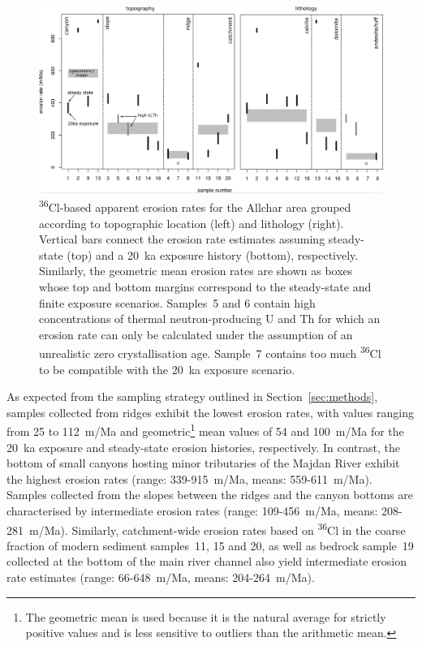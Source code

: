 \documentclass[titlepage]{article}
\begin{document}
\begin{figure}[!ht]
  \centering
  \includegraphics[width=\textwidth]{comparison.png}
  \caption{\textsuperscript{36}Cl-based apparent erosion rates for the
    Allchar area grouped according to topographic location (left) and
    lithology (right). Vertical bars connect the erosion rate
    estimates assuming steady-state (top) and a 20~ka exposure history
    (bottom), respectively. Similarly, the geometric mean erosion
    rates are shown as boxes whose top and bottom margins correspond
    to the steady-state and finite exposure scenarios. Samples~5 and 6
    contain high concentrations of thermal neutron-producing U and Th
    for which an erosion rate can only be calculated under the
    assumption of an unrealistic zero crystallisation age.  Sample~7
    contains too much \textsuperscript{36}Cl to be compatible with the
    20~ka exposure scenario.}
  \label{fig:comparison}
\end{figure}


As expected from the sampling strategy outlined in
Section~\ref{sec:methods}, samples collected from ridges exhibit the
lowest erosion rates, with values ranging from 25 to 112~m/Ma and
geometric\footnote{The geometric mean is used because it is the
  natural average for strictly positive values and is less sensitive
  to outliers than the arithmetic mean.}  mean values of 54 and
100~m/Ma for the 20~ka exposure and steady-state erosion histories,
respectively. In contrast, the bottom of small canyons hosting minor
tributaries of the Majdan River exhibit the highest erosion rates
(range: 339-915~m/Ma, means: 559-611~m/Ma).\\

Samples collected from the slopes between the ridges and the canyon
bottoms are characterised by intermediate erosion rates (range:
109-456~m/Ma, means: 208-281~m/Ma).  Similarly, catchment-wide erosion
rates based on \textsuperscript{36}Cl in the coarse fraction of modern
sediment samples~11, 15 and 20, as well as bedrock sample~19 collected
at the bottom of the main river channel also yield intermediate
erosion rate estimates (range: 66-648~m/Ma, means: 204-264~m/Ma).\\
\end{document}
